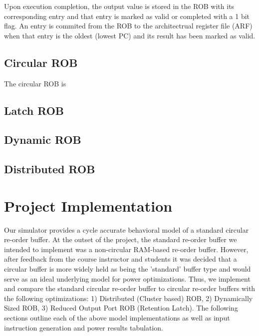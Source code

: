 \documentclass{acm_proc_article-sp}
\begin{document}
Upon execution completion, the output value is stored in the ROB with its 
corresponding entry and that entry is marked as valid or completed with a 
1 bit flag.  An entry is commited from the ROB to the architectrual register
file (ARF) when that entry is the oldest (lowest PC) and its result has been 
marked as valid. 
\subsection{Circular ROB}
The circular ROB is 
\subsection{Latch ROB}
\subsection{Dynamic ROB}
\subsection{Distributed ROB}

\section{Project Implementation}
	Our simulator provides a cycle accurate behavioral model of a standard circular re-order buffer.  At the outset of the project, the standard re-order buffer we intended to implement was a non-circular RAM-based re-order buffer.  However, after feedback from the course instructor and students it was decided that a circular buffer is more widely held as being the 'standard' buffer type and would serve as an ideal underlying model for power optimizations.  Thus, we implement and compare the standard circular re-order buffer to circular re-order buffers with the following optimizations: 1) Distributed (Cluster based) ROB, 2) Dynamically Sized ROB, 3) Reduced Output Port ROB (Retention Latch). The following sections outline each of the above model implementations as well as input instruction generation and power results tabulation.  
\end{document}
